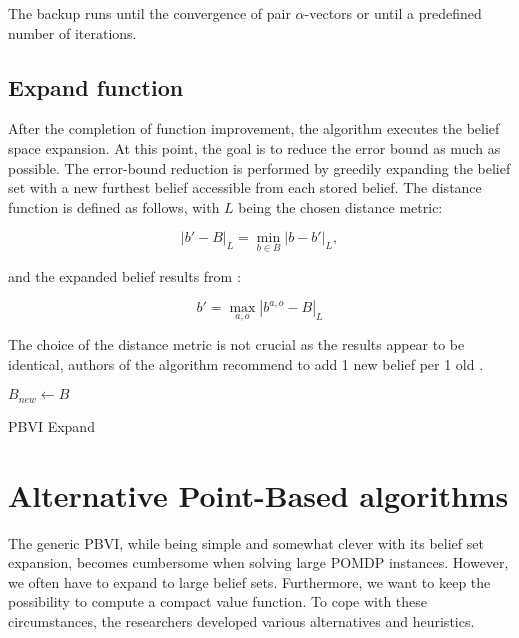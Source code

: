 The backup runs until the convergence of pair $\alpha$-vectors or until a predefined number of iterations.

\subsection{Expand function}

After the completion of function improvement, the algorithm executes the belief space expansion. At this point, the goal is to reduce the error bound as much as possible. The error-bound reduction is performed by greedily expanding the belief set with a new furthest belief accessible from each stored belief. The distance function is defined as follows, with $L$ being the chosen distance metric:

\begin{equation}|b' - B|_L = \operatorname*{min}_{b \in B} |b - b'|_L,\end{equation}

and the expanded belief results from :

\begin{equation}b' = \operatorname*{max}_{a, o} |b^{a, o} - B|_L\end{equation}

The choice of the distance metric is not crucial as the results appear to be identical, authors of the algorithm recommend to add 1 new belief per 1 old \cite{pbvi}.


\LinesNumbered
\begin{algorithm}[H]
\SetAlgoLined
$B_{new} \xleftarrow{} B$ 
\caption{PBVI Expand}
\end{algorithm}



\section{Alternative Point-Based algorithms}

The generic PBVI, while being simple and somewhat clever with its belief set expansion, becomes cumbersome when solving large POMDP instances. However, we often have to expand to large belief sets. Furthermore, we want to keep the possibility to compute a compact value function. To cope with these circumstances, the researchers developed various alternatives and heuristics.


